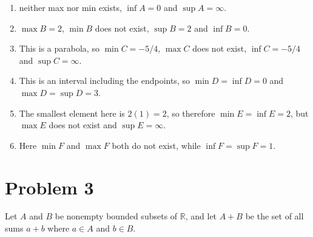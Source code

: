 \documentclass[10pt]{article}
\begin{document}
    \begin{solution}
        \begin{enumerate}[label=(\alph*)]
            \item neither max nor min exists, $\inf A = 0$ and $\sup A = \infty$.
            \item $\max B = 2$, $\min B$ does not exist, $\sup B = 2$ and $\inf B = 0$.
            \item This is a parabola, so $\min C = -5/4$, $\max C$ does not exist, $\inf C = -5/4$ and $\sup C = \infty$.
            \item This is an interval including the endpoints, so $\min D = \inf D = 0$ and $\max D = \sup D = 3$.
            \item The smallest element here is $2(1) = 2$, so therefore $\min E = \inf E = 2$, but $\max E$ does not exist and $\sup E = \infty$.
            \item Here $\min F$ and $\max F$ both do not exist, while $\inf F = \sup F = 1$.
        \end{enumerate}
    \end{solution}

    \pagebreak

    \section*{Problem 3}
    Let $A$ and $B$ be nonempty bounded subsets of $\mathbb R$, and let $A +B$ be the set of all sums $a+b$ where $a \in A$ and $b \in B$. 
\end{document}
